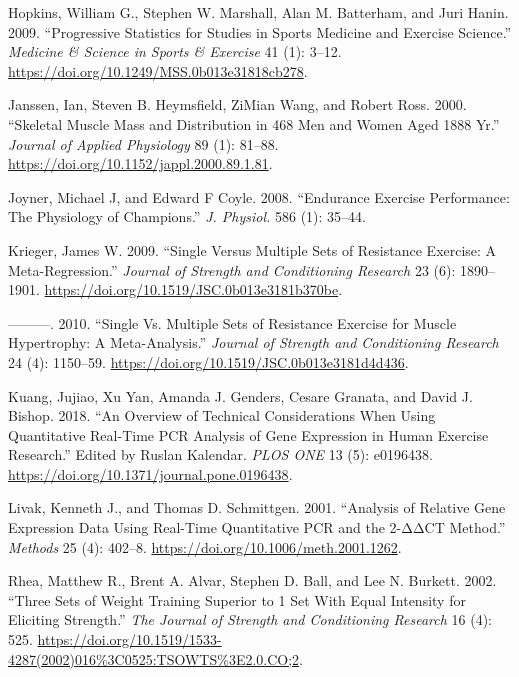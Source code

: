 \documentclass[
  letterpaper,
  DIV=11,
  numbers=noendperiod]{scrreprt}
\newlength{\cslhangindent}
\newenvironment{CSLReferences}[2] %
 {\begin{list}{}{%
  \setlength{\itemindent}{0pt}
  \setlength{\leftmargin}{0pt}
  \setlength{\parsep}{0pt}
  \ifodd #1
   \setlength{\leftmargin}{\cslhangindent}
   \setlength{\itemindent}{-1\cslhangindent}
  \fi
  \setlength{\itemsep}{#2\baselineskip}}}
 {\end{list}}
\begin{document}
\begin{CSLReferences}{1}{0}
Hopkins, William G., Stephen W. Marshall, Alan M. Batterham, and Juri
Hanin. 2009. {``Progressive Statistics for Studies in Sports Medicine
and Exercise Science.''} \emph{Medicine \& Science in Sports \&
Exercise} 41 (1): 3--12.
\url{https://doi.org/10.1249/MSS.0b013e31818cb278}.

Janssen, Ian, Steven B. Heymsfield, ZiMian Wang, and Robert Ross. 2000.
{``Skeletal Muscle Mass and Distribution in 468 Men and Women Aged
18{\textendash}88 Yr.''} \emph{Journal of Applied Physiology} 89 (1):
81--88. \url{https://doi.org/10.1152/jappl.2000.89.1.81}.

Joyner, Michael J, and Edward F Coyle. 2008. {``Endurance Exercise
Performance: The Physiology of Champions.''} \emph{J. Physiol.} 586 (1):
35--44.

Krieger, James W. 2009. {``Single Versus Multiple Sets of Resistance
Exercise: A Meta-Regression.''} \emph{Journal of Strength and
Conditioning Research} 23 (6): 1890--1901.
\url{https://doi.org/10.1519/JSC.0b013e3181b370be}.

---------. 2010. {``Single Vs. Multiple Sets of Resistance Exercise for
Muscle Hypertrophy: A Meta-Analysis.''} \emph{Journal of Strength and
Conditioning Research} 24 (4): 1150--59.
\url{https://doi.org/10.1519/JSC.0b013e3181d4d436}.

Kuang, Jujiao, Xu Yan, Amanda J. Genders, Cesare Granata, and David J.
Bishop. 2018. {``An Overview of Technical Considerations When Using
Quantitative Real-Time PCR Analysis of Gene Expression in Human Exercise
Research.''} Edited by Ruslan Kalendar. \emph{PLOS ONE} 13 (5):
e0196438. \url{https://doi.org/10.1371/journal.pone.0196438}.

Livak, Kenneth J., and Thomas D. Schmittgen. 2001. {``Analysis of
Relative Gene Expression Data Using Real-Time Quantitative PCR and the
2{-}ΔΔCT Method.''} \emph{Methods} 25 (4): 402--8.
\url{https://doi.org/10.1006/meth.2001.1262}.

Rhea, Matthew R., Brent A. Alvar, Stephen D. Ball, and Lee N. Burkett.
2002. {``Three Sets of Weight Training Superior to 1 Set With Equal
Intensity for Eliciting Strength.''} \emph{The Journal of Strength and
Conditioning Research} 16 (4): 525.
\url{https://doi.org/10.1519/1533-4287(2002)016\%3C0525:TSOWTS\%3E2.0.CO;2}.


\end{CSLReferences}
\end{document}
